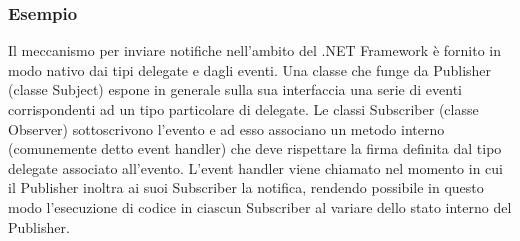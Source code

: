 \documentclass[a4paper,10pt]{article}
\begin{document}
                            \subsubsection{Esempio}
                            Il meccanismo per inviare notifiche nell’ambito del .NET Framework è fornito in modo nativo dai tipi delegate e dagli eventi. Una classe che funge da Publisher (classe Subject) espone in generale sulla sua interfaccia una serie di eventi corrispondenti ad un tipo particolare di delegate. Le classi Subscriber (classe Observer) sottoscrivono l’evento e ad esso associano un metodo interno (comunemente detto event handler) che deve rispettare la firma definita dal tipo delegate associato all’evento. L’event handler viene chiamato nel momento in cui il Publisher inoltra ai suoi Subscriber la notifica, rendendo possibile in questo modo l’esecuzione di codice in ciascun Subscriber al variare dello stato interno del Publisher.
\end{document}
